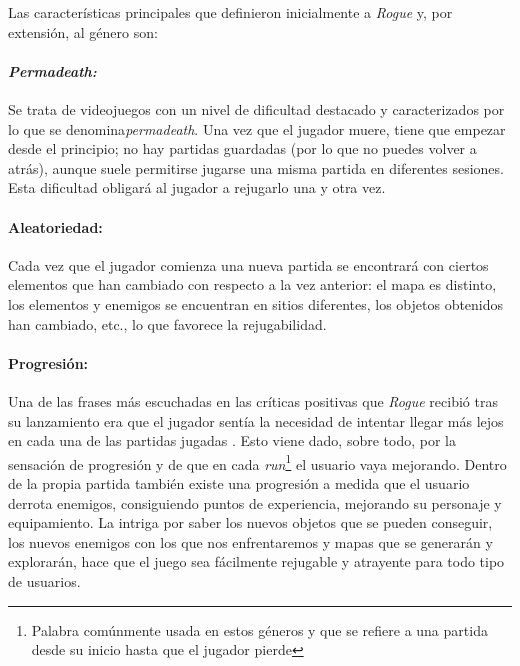 Las características principales que definieron inicialmente a \textit{Rogue} y, por extensión, al género son:

\paragraph{\textit{Permadeath:}} Se trata de videojuegos con un nivel de dificultad destacado y caracterizados por lo que se denomina\textit{permadeath}. Una vez que el jugador muere, tiene que empezar desde el principio; no hay partidas guardadas (por lo que no puedes volver a atrás), aunque suele permitirse jugarse una misma partida en diferentes sesiones. Esta dificultad obligará al jugador a rejugarlo una y otra vez.

\paragraph{Aleatoriedad:} Cada vez que el jugador comienza una nueva partida se encontrará con ciertos elementos que han cambiado con respecto a la vez anterior: el mapa es distinto, los elementos y enemigos se encuentran en sitios diferentes, los objetos obtenidos han cambiado, etc., lo que favorece la rejugabilidad.

\paragraph{Progresión:} Una de las frases más escuchadas en las críticas positivas que \textit{Rogue} recibió tras su lanzamiento era que el jugador sentía la necesidad de intentar llegar más lejos en cada una de las partidas jugadas \cite{website:machinesnetworks}. Esto viene dado, sobre todo, por la sensación de progresión y de que en cada \textit{run}\footnote{Palabra comúnmente usada en estos géneros y que se refiere a una partida desde su inicio hasta que el jugador pierde} el usuario vaya mejorando. Dentro de la propia partida también existe una progresión a medida que el usuario derrota enemigos, consiguiendo puntos de experiencia, mejorando su personaje y equipamiento. La intriga por saber los nuevos objetos que se pueden conseguir, los nuevos enemigos con los que nos enfrentaremos y mapas que se generarán y explorarán, hace que el juego sea fácilmente rejugable y atrayente para todo tipo de usuarios.

